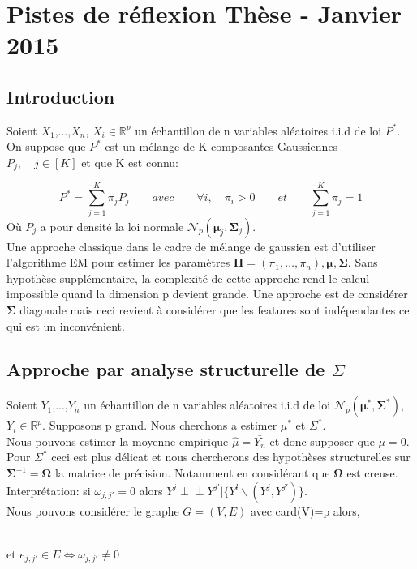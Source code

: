 \documentclass[12pt]{article}
\let\bb\mathbb       %
\def\RR{{\bb R}}\def\ZZ{{\bb Z}}\def\FF{{\bb F}}\def\DD{{\bb D}}
\def\bb{\mathbb}
\def\hat{\widehat}
\def\bSigma{\boldsymbol\Sigma}
\def\bOmega{\boldsymbol\Omega}
\def\bmu{\boldsymbol\mu}
\def\bPi{\boldsymbol\Pi}
\def\ci{\perp\!\!\!\perp}
\begin{document}
\section{Pistes de réflexion Thèse - Janvier 2015}
\subsection{Introduction}

Soient $X_1$,...,$X_n$, $X_i\in\RR^p$  un échantillon de n variables aléatoires i.i.d de loi $P^*$. On suppose que $P^*$ est un mélange de K composantes Gaussiennes\\ $P_j,\quad j\in [K]$ et que K est connu:

$$
P^* = \sum_{j=1}^K \pi_jP_j \qquad avec \qquad \forall i, \quad \pi_i>0 \qquad et \qquad \sum_{j=1}^K\pi_j=1
$$
Où $P_j$ a pour densité la loi normale  $\mathcal N_p(\bmu_j,\bSigma_j)$.
\\

Une approche classique dans le cadre de mélange de gaussien est d'utiliser l'algorithme EM pour estimer les paramètres $\bPi=(\pi_1,\dots,\pi_n),\bmu,\bSigma$. Sans hypothèse supplémentaire, la complexité de cette approche rend le calcul impossible quand la dimension p devient grande. Une approche est de considérer $\bSigma$ diagonale mais ceci revient à considérer que les features sont indépendantes ce qui est un inconvénient.

\subsection{Approche par analyse structurelle de $\Sigma$}

Soient $Y_1$,...,$Y_n$ un échantillon de n variables aléatoires i.i.d de loi $\mathcal N_p(\bmu^*,\bSigma^*)$, $Y_i\in\RR^p$. Supposons p grand. Nous cherchons a estimer $\mu^*$ et $\Sigma^*$.
\\
Nous pouvons estimer la moyenne empirique $\hat{\mu}=\bar{Y_n}$ et donc supposer que $\mu=0$. Pour $\Sigma^*$ ceci est plus délicat et nous chercherons des hypothèses structurelles sur $\bSigma^{-1}=\bOmega$ la matrice de précision. Notamment en considérant que $\bOmega$ est creuse.
Interprétation: si $\omega_{j,j'}=0$ alors $Y^j \ci Y^{j'}|\{Y^l\backslash (Y^j,Y^{j'})\}$.\\
Nous pouvons considérer le graphe $G=(V,E)$ avec card(V)=p alors,
\begin{figure}[!h]
\centering
{}
\end{figure}
\\
et $e_{j,j'}\in E \iff \omega_{j,j'} \neq 0$
\end{document}
